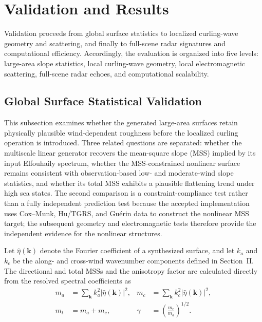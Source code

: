 \section{Validation and Results}
\label{sec:validation_results}

Validation proceeds from global surface statistics to localized curling-wave geometry and scattering, and finally to full-scene radar signatures and computational efficiency. Accordingly, the evaluation is organized into five levels: large-area slope statistics, local curling-wave geometry, local electromagnetic scattering, full-scene radar echoes, and computational scalability.






\subsection{Global Surface Statistical Validation}
\label{subsec:global_surface_validation}

This subsection examines whether the generated large-area surfaces retain physically plausible wind-dependent roughness before the localized curling operation is introduced. Three related questions are separated: whether the multiscale linear generator recovers the mean-square slope (MSS) implied by its input Elfouhaily spectrum, whether the MSS-constrained nonlinear surface remains consistent with observation-based low- and moderate-wind slope statistics, and whether its total MSS exhibits a plausible flattening trend under high sea states. The second comparison is a constraint-compliance test rather than a fully independent prediction test because the accepted implementation uses Cox--Munk, Hu/TGRS, and Gu\'erin data to construct the nonlinear MSS target; the subsequent geometry and electromagnetic tests therefore provide the independent evidence for the nonlinear structures.

Let $\widehat{\eta}(\boldsymbol{k})$ denote the Fourier coefficient of a synthesized surface, and let $k_a$ and $k_c$ be the along- and cross-wind wavenumber components defined in Section~II. The directional and total MSSs and the anisotropy factor are calculated directly from the resolved spectral coefficients as
\begin{equation}
\begin{aligned}
m_a&=\sum_{\boldsymbol{k}}k_a^2
\left|\widehat{\eta}(\boldsymbol{k})\right|^2,
&
m_c&=\sum_{\boldsymbol{k}}k_c^2
\left|\widehat{\eta}(\boldsymbol{k})\right|^2,
\\
m_t&=m_a+m_c,
&
\gamma&=\left(\frac{m_c}{m_a}\right)^{1/2}.
\end{aligned}
\label{eq:validation_mss_metrics}
\end{equation}

